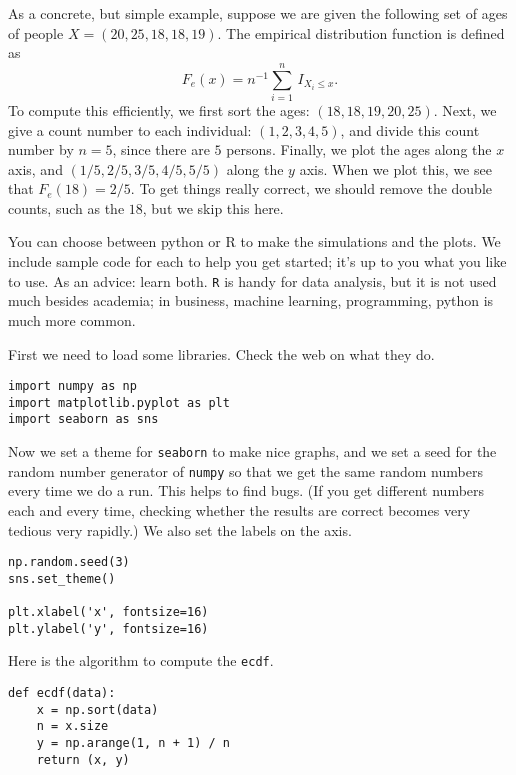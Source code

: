 \documentclass[a4paper]{article}
\theoremstyle{definition}
\newcommand{\1}[1]{\,I_{#1}} %
\begin{document}
As a concrete, but simple example, suppose we are given the following set of ages of people \(X = (20, 25, 18, 18, 19)\). The empirical distribution function is defined as
\begin{equation*}
F_e(x) = n^{-1}\sum_{i=1}^n \1{X_i\leq x}.
\end{equation*}
To compute this efficiently, we first sort the ages: \((18, 18, 19, 20, 25)\). Next, we give a count number to each individual: \((1,2,3,4,5)\), and divide this count number by \(n=5\), since there are \(5\) persons. Finally, we plot the ages along the \(x\) axis, and \((1/5, 2/5, 3/5, 4/5, 5/5)\) along the \(y\) axis. When we plot this, we see that \(F_{e}(18) = 2/5\). To get things really correct, we should remove the double counts, such as the \(18\), but we skip this here. 


You can choose between  python  or R to make the simulations and the plots.
We include sample code for each to help you get started; it's up to you what you like to use.
As an advice: learn both.
\texttt{R} is handy for data analysis, but it is not used much besides academia; in business, machine learning, programming, python is much more common. 


First we need to load some libraries. Check the web on what they do.


\begin{verbatim}
import numpy as np
import matplotlib.pyplot as plt
import seaborn as sns
\end{verbatim}

Now we set a theme for \texttt{seaborn} to make nice graphs, and we set a seed for the random number generator of \texttt{numpy} so that we get the same random numbers every time we do a run.
This helps to find bugs.
(If you get different numbers each and every time, checking whether the results are correct becomes very tedious very rapidly.)
We also set the labels on the axis.

\begin{verbatim}
np.random.seed(3)
sns.set_theme()

plt.xlabel('x', fontsize=16)
plt.ylabel('y', fontsize=16)
\end{verbatim}


Here is the algorithm to compute the \texttt{ecdf}.
\begin{verbatim}
def ecdf(data):
    x = np.sort(data)
    n = x.size
    y = np.arange(1, n + 1) / n
    return (x, y)
\end{verbatim}
\end{document}
